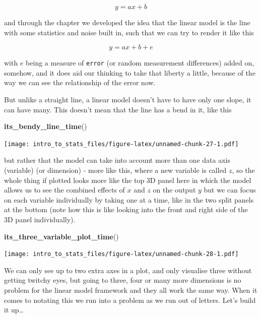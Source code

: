 \documentclass[
]{book}
\newenvironment{Shaded}{\begin{snugshade}}{\end{snugshade}}
\newcommand{\KeywordTok}[1]{\textcolor[rgb]{0.13,0.29,0.53}{\textbf{#1}}}
\newcommand{\NormalTok}[1]{#1}
\begin{document}
\begin{equation}
 y = ax + b
\end{equation}

and through the chapter we developed the idea that the linear model is the line with some statistics and noise built in, such that we can try to render it like this

\begin{equation}
 y = ax + b + e
\end{equation}

with \(e\) being a measure of \texttt{error} (or random measurement differences) added on, somehow, and it does aid our thinking to take that liberty a little, because of the way we can see the relationship of the error now.

But unlike a straight line, a linear model doesn't have to have only one slope, it can have many. This doesn't mean that the line has a bend in it, like this

\begin{Shaded}
\begin{Highlighting}[]
\KeywordTok{its_bendy_line_time}\NormalTok{()}
\end{Highlighting}
\end{Shaded}

\texttt{[image: intro\_to\_stats\_files/figure-latex/unnamed-chunk-27-1.pdf]}

but rather that the model can take into account more than one data axis (variable) (or dimension) - more like this, where a new variable is called \(z\), so the whole thing if plotted looks more like the top 3D panel here in which the model allows us to see the combined effects of \(x\) and \(z\) on the output \(y\) but we can focus on each variable individually by taking one at a time, like in the two split panels at the bottom (note how this is like looking into the front and right side of the 3D panel individually).

\begin{Shaded}
\begin{Highlighting}[]
\KeywordTok{its_three_variable_plot_time}\NormalTok{()}
\end{Highlighting}
\end{Shaded}

\texttt{[image: intro\_to\_stats\_files/figure-latex/unnamed-chunk-28-1.pdf]}

We can only see up to two extra axes in a plot, and only visualise three without getting twitchy eyes, but going to three, four or many more dimensions is no problem for the linear model framework and they all work the same way. When it comes to notating this we run into a problem as we run out of letters. Let's build it up\ldots{}
\end{document}
